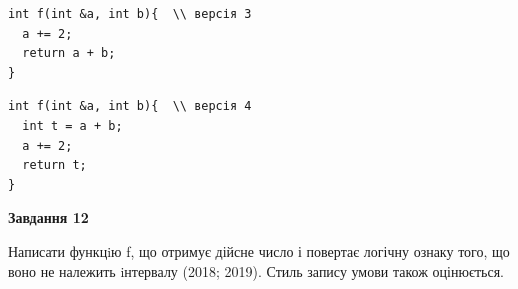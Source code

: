 \documentclass[12pt, ukrainian]{article}
\begin{document}
{\begin {large}
\begin{minipage}[t]{11.0cm}
\vspace{-8mm}\begin{verbatim}
int f(int &a, int b){  \\ версія 3
  a += 2;
  return a + b;
}
\end{verbatim}

\vspace{-8mm}\begin{verbatim}
int f(int &a, int b){  \\ версія 4
  int t = a + b;
  a += 2;
  return t;
}
\end{verbatim}



\begin{center}
\textbf{Завдання 12}
\end{center}

Написати функцiю f, що отримує дійсне число і повертає логічну ознаку того, що воно не належить iнтервалу (2018; 2019). Стиль запису умови також оцінюється.\par

\end{minipage}

\end {large}}
\newpage
\end{document}
